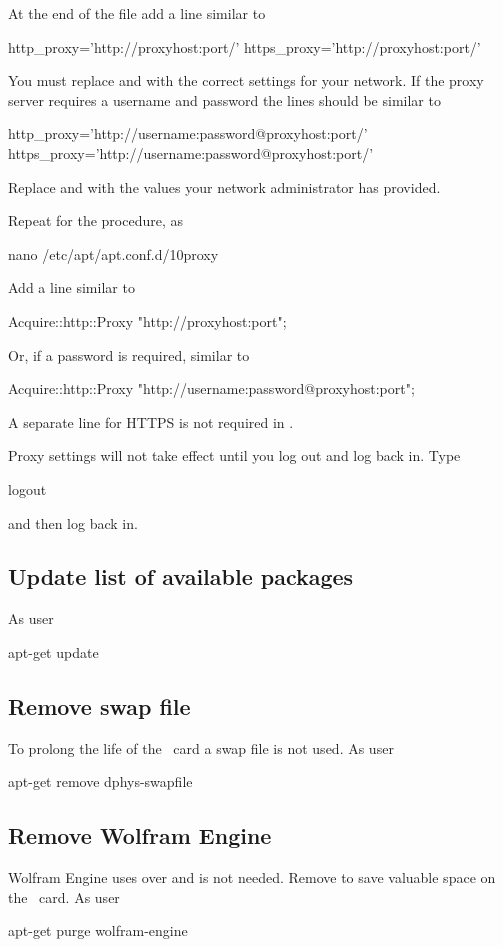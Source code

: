 At the end of the file add a line similar to
\begin{Cmd}
http_proxy='http://proxyhost:port/'
https_proxy='http://proxyhost:port/'
\end{Cmd}
You must replace  and  with the correct
settings for your network. If the proxy server requires a username and
password the lines should be similar to
\begin{Cmd}
http_proxy='http://username:password@proxyhost:port/'
https_proxy='http://username:password@proxyhost:port/'
\end{Cmd}
Replace  and  with the values your
network administrator has provided.

Repeat for the procedure, as \rootUser
\begin{Cmd}
nano /etc/apt/apt.conf.d/10proxy
\end{Cmd}

Add a line similar to
\begin{Cmd}
Acquire::http::Proxy "http://proxyhost:port";
\end{Cmd}
Or, if a password is required, similar to
\begin{Cmd}
Acquire::http::Proxy "http://username:password@proxyhost:port";
\end{Cmd}
A separate line for HTTPS is not required in
.

Proxy settings will not take effect until you log out and log back
in. Type
\begin{Cmd}
logout
\end{Cmd}
and then log back in.

\subsection{Update list of available packages}
As user \rootUser
\begin{Cmd}
apt-get update  
\end{Cmd}

\subsection{Remove swap file}
To prolong the life of the \sd\ card a swap file is not used. As user
\rootUser
\begin{Cmd}
apt-get remove dphys-swapfile  
\end{Cmd}

\subsection{Remove Wolfram Engine}
Wolfram Engine uses over  and is not needed. Remove to save
valuable space on the \sd\ card. As user \rootUser
\begin{Cmd}
apt-get purge wolfram-engine
\end{Cmd}

